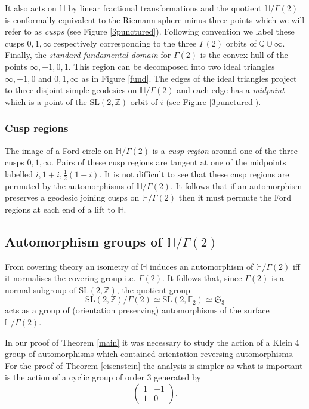 \documentclass[12pt]{amsart}
\theoremstyle{plain}
\theoremstyle{definition}
\def\HH{\mathbb{H}}
\def\xx{\HH/g2}
\def\ZZ{\mathbb{Z}}
\def\QQ{\mathbb{Q}}
\def\sl2{\mathrm{SL}(2, \ZZ)}
\def\g2{\Gamma(2)}
\def\xx{\HH/\g2}
\begin{document}
It also acts on $\HH$ by linear fractional transformations
and the  quotient $\xx$ is conformally equivalent to the Riemann  sphere minus three points
which we will refer to as \textit{cusps}
(see Figure \ref{3punctured}). 
Following  convention we label these cusps $0,1,\infty$ respectively
corresponding to the three $\g2$ orbits of $\QQ \cup \infty$. 
Finally, the \textit{standard fundamental domain}  for $\g2$ 
is the convex hull of the points $\infty, -1, 0 , 1$.
This region can be decomposed into two ideal triangles 
$\infty, -1, 0 $ and $ 0 , 1,\infty$ as in Figure \ref{fund}.
The edges of the ideal triangles project to three disjoint simple geodesics on $\xx$
and each edge has a \textit{midpoint} 
which is a point of the $\sl2$ orbit of $i$ (see Figure \ref{3punctured}).



\subsubsection{Cusp regions}

The image of a Ford circle on $\xx$ is a \textit{cusp region}
around one of the three cusps $0,1,\infty$.
Pairs of these cusp regions are tangent at one of the midpoints
labelled $i, 1+i, \frac12(1+i)$.
It is not difficult to see that these cusp regions 
are permuted by the automorphisms of $\xx$.
It follows that if an automorphism preserves a geodesic  joining cusps on $\xx$
then it must permute the Ford regions at each end of a lift to $\HH$.


\subsection{Automorphism groups of $\xx$}
From covering theory an isometry  of $\HH$ 
induces an automorphism of $\xx$ iff it normalises the covering group
i.e. $\g2$.
It follows that,
since $\g2$ is a normal subgroup of $\sl2$,
 the quotient group
 $$ \sl2/\g2 \simeq \mathrm{SL}(2, \mathbb{F}_2) \simeq \mathfrak{S}_3$$
acts as a group of (orientation preserving) automorphisms of the surface $\xx$.



In our proof of Theorem \ref{main}
it was necessary to study the action of
a Klein 4 group of automorphisms
which contained orientation reversing automorphisms.
For the proof of Theorem \ref{eisenstein}
the analysis is simpler as what is important
is  the action of a
cyclic group of order 3
generated by
$$ \begin{pmatrix}
1 & -1 \\
1 & 0
\end{pmatrix} .$$
\end{document}
